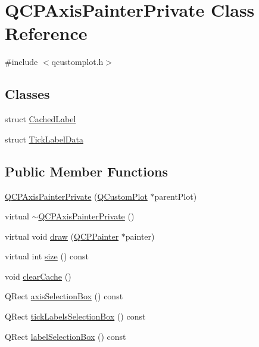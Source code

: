 \hypertarget{class_q_c_p_axis_painter_private}{}\section{Q\+C\+P\+Axis\+Painter\+Private Class Reference}
\label{class_q_c_p_axis_painter_private}


{\ttfamily \#include $<$qcustomplot.\+h$>$}

\subsection*{Classes}
\begin{DoxyCompactItemize}
\item 
struct \mbox{\hyperlink{struct_q_c_p_axis_painter_private_1_1_cached_label}{Cached\+Label}}
\item 
struct \mbox{\hyperlink{struct_q_c_p_axis_painter_private_1_1_tick_label_data}{Tick\+Label\+Data}}
\end{DoxyCompactItemize}
\subsection*{Public Member Functions}
\begin{DoxyCompactItemize}
\item 
\mbox{\hyperlink{class_q_c_p_axis_painter_private_a0f14aa5c4aa83dbcd68984a7c73bf94f}{Q\+C\+P\+Axis\+Painter\+Private}} (\mbox{\hyperlink{class_q_custom_plot}{Q\+Custom\+Plot}} $\ast$parent\+Plot)
\item 
virtual \mbox{\hyperlink{class_q_c_p_axis_painter_private_a7c7f95313f0f78c3c3975f822a5fea35}{$\sim$\+Q\+C\+P\+Axis\+Painter\+Private}} ()
\item 
virtual void \mbox{\hyperlink{class_q_c_p_axis_painter_private_a0207a99bdf9c4f70af20928898ddc2fc}{draw}} (\mbox{\hyperlink{class_q_c_p_painter}{Q\+C\+P\+Painter}} $\ast$painter)
\item 
virtual int \mbox{\hyperlink{class_q_c_p_axis_painter_private_a60fc2eec99ed23e9a3c98e8f7e5730b0}{size}} () const
\item 
void \mbox{\hyperlink{class_q_c_p_axis_painter_private_a7b6806e32c44384fd0ae4dcdaa72b1b5}{clear\+Cache}} ()
\item 
Q\+Rect \mbox{\hyperlink{class_q_c_p_axis_painter_private_ab29635564acb5d0012fa9e297477db05}{axis\+Selection\+Box}} () const
\item 
Q\+Rect \mbox{\hyperlink{class_q_c_p_axis_painter_private_acf8a4fef47cec70b596fe20941aa5b16}{tick\+Labels\+Selection\+Box}} () const
\item 
Q\+Rect \mbox{\hyperlink{class_q_c_p_axis_painter_private_ae7800667d15867040ada5f4bf027f070}{label\+Selection\+Box}} () const
\end{DoxyCompactItemize}
